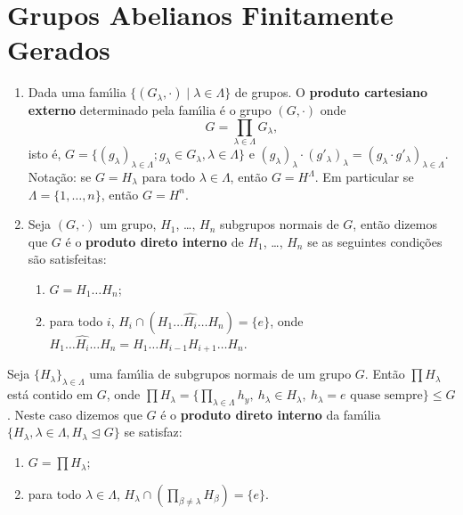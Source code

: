 \chapter{Grupos Abelianos Finitamente Gerados} %
\label{cha:grupos_abelianos_finitamente_gerados}

\begin{definicao}
	\begin{enumerate}
		\item Dada uma fam{\'\i}lia $\{(G_\lambda,\cdot) \mid \lambda \in \Lambda\}$ de grupos. O \textbf{produto cartesiano externo} determinado pela fam{\'\i}lia \'e o grupo $(G, \cdot)$ onde
		\[
			G = \displaystyle\prod_{\lambda \in \Lambda} G_\lambda,
		\]
		isto \'e, $G = \{(g_\lambda)_{\lambda \in \Lambda}; g_\lambda \in G_\lambda, \lambda \in \Lambda\}$ e $(g_\lambda)_\lambda \cdot (g'_\lambda)_\lambda = (g_\lambda\cdot g'_\lambda)_{\lambda \in \Lambda}$. Nota\c{c}\~ao: se $G = H_\lambda$ para todo $\lambda \in \Lambda$, ent\~ao $G = H^\Lambda$. Em particular se $\Lambda = \{1, \dots, n\}$, ent\~ao $G = H^n$.
		\item Seja $(G, \cdot)$ um grupo, $H_1$, \dots, $H_n$ subgrupos normais de $G$, ent\~ao dizemos que $G$ \'e o \textbf{produto direto interno} de $H_1$, \dots, $H_n$ se as seguintes condi\c{c}\~oes s\~ao satisfeitas:
		\begin{enumerate}
			\item $G = H_1\dots H_n$;
			\item para todo $i$, $H_i \cap (H_1 \dots \hat{H_i}\dots H_n) = \{e\}$, onde $H_1 \dots \hat{H_i}\dots H_n = H_1 \dots H_{i - 1}H_{i + 1}\dots H_n$.
		\end{enumerate}
	\end{enumerate}
\end{definicao}

\begin{observacao}
	Seja $\{H_\lambda\}_{\lambda \in \Lambda}$ uma fam{\'\i}lia de subgrupos normais de um grupo $G$. Ent\~ao $\prod H_\lambda$ est\'a contido em $G$, onde $\prod H_\lambda = \{\prod_{\lambda \in \Lambda} h_y,\ h_\lambda \in H_\lambda,\ h_\lambda = e \mbox{ quase sempre}\} \le G$. Neste caso dizemos que $G$ \'e o \textbf{produto direto interno} da fam{\'\i}lia $\{H_\lambda, \lambda \in \Lambda, H_\lambda \unlhd G\}$ se satisfaz:
	\begin{enumerate}
		\item $G = \prod H_\lambda$;
		\item para todo $\lambda \in \Lambda$, $H_\lambda \cap (\prod_{\beta \ne \lambda}H_\beta) = \{e\}$.
	\end{enumerate}
\end{observacao}

